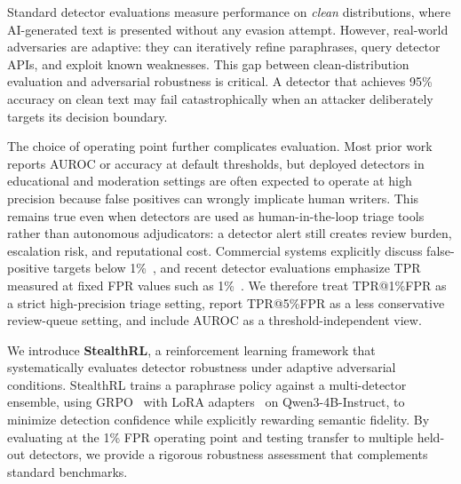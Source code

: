 \documentclass[11pt]{article}
\begin{document}
Standard detector evaluations measure performance on \emph{clean} distributions, where AI-generated text is presented without any evasion attempt. However, real-world adversaries are adaptive: they can iteratively refine paraphrases, query detector APIs, and exploit known weaknesses. This gap between clean-distribution evaluation and adversarial robustness is critical. A detector that achieves 95\% accuracy on clean text may fail catastrophically when an attacker deliberately targets its decision boundary.

The choice of operating point further complicates evaluation. Most prior work reports AUROC or accuracy at default thresholds, but deployed detectors in educational and moderation settings are often expected to operate at high precision because false positives can wrongly implicate human writers. This remains true even when detectors are used as human-in-the-loop triage tools rather than autonomous adjudicators: a detector alert still creates review burden, escalation risk, and reputational cost. Commercial systems explicitly discuss false-positive targets below 1\%~\cite{turnitin2023falsepositives}, and recent detector evaluations emphasize TPR measured at fixed FPR values such as 1\%~\cite{tufts-etal-2025-practical}. We therefore treat TPR@1\%FPR as a strict high-precision triage setting, report TPR@5\%FPR as a less conservative review-queue setting, and include AUROC as a threshold-independent view.

We introduce \textbf{StealthRL}, a reinforcement learning framework that systematically evaluates detector robustness under adaptive adversarial conditions. StealthRL trains a paraphrase policy against a multi-detector ensemble, using GRPO~\cite{pang2025grpo} with LoRA adapters~\cite{hu2021loralowrankadaptationlarge} on Qwen3-4B-Instruct, to minimize detection confidence while explicitly rewarding semantic fidelity. By evaluating at the 1\% FPR operating point and testing transfer to multiple held-out detectors, we provide a rigorous robustness assessment that complements standard benchmarks.
\end{document}

